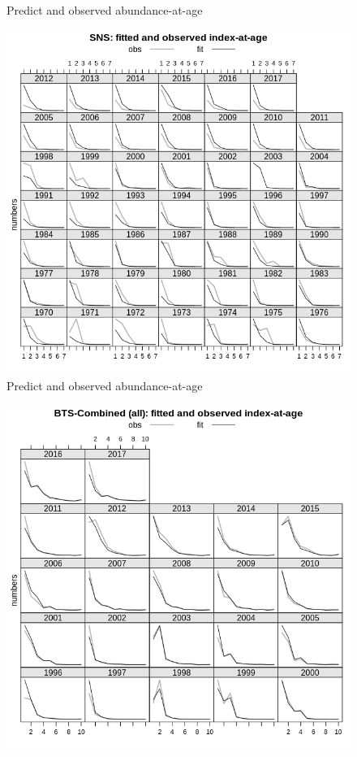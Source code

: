 \documentclass[a4paper,english,10pt]{article}\usepackage[]{graphicx}\usepackage[]{color}
\newenvironment{knitrout}{}{} %
\begin{document}
\begin{knitrout}
\begin{figure}[H]
{}

\caption[Predict and observed abundance-at-age]{Predict and observed abundance-at-age}\label{fig:idxplt2}
\end{figure}

\begin{figure}[H]

{\centering \includegraphics[width=.9\linewidth]{figure/idxplt-3} 

}

\caption[Predict and observed abundance-at-age]{Predict and observed abundance-at-age}\label{fig:idxplt3}
\end{figure}

\begin{figure}[H]

{\centering \includegraphics[width=.9\linewidth]{figure/idxplt-4} 

}
\end{figure}
\end{knitrout}
\end{document}
